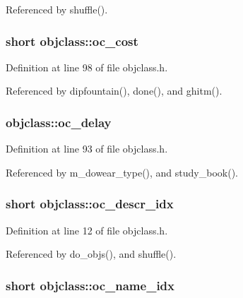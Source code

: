 Referenced by shuffle().

\hypertarget{structobjclass_aaf9cdc5c158d5ee7aad87728dcaa31cf}{
\subsubsection[{oc\+\_\+cost}]{\setlength{\rightskip}{0pt plus 5cm}short objclass\+::oc\+\_\+cost}}\label{structobjclass_aaf9cdc5c158d5ee7aad87728dcaa31cf}


Definition at line 98 of file objclass.\+h.



Referenced by dipfountain(), done(), and ghitm().

\hypertarget{structobjclass_a3469efe1c95970cd0360b882459a42ae}{
\subsubsection[{oc\+\_\+delay}]{ objclass\+::oc\+\_\+delay}}\label{structobjclass_a3469efe1c95970cd0360b882459a42ae}


Definition at line 93 of file objclass.\+h.



Referenced by m\+\_\+dowear\+\_\+type(), and study\+\_\+book().

\hypertarget{structobjclass_a4b22aa20d7c87b250d6696e1614b86cc}{
\subsubsection[{oc\+\_\+descr\+\_\+idx}]{\setlength{\rightskip}{0pt plus 5cm}short objclass\+::oc\+\_\+descr\+\_\+idx}}\label{structobjclass_a4b22aa20d7c87b250d6696e1614b86cc}


Definition at line 12 of file objclass.\+h.



Referenced by do\+\_\+objs(), and shuffle().

\hypertarget{structobjclass_adb4e710c1fe8070f63bb31017783e1ff}{
\subsubsection[{oc\+\_\+name\+\_\+idx}]{\setlength{\rightskip}{0pt plus 5cm}short objclass\+::oc\+\_\+name\+\_\+idx}}\label{structobjclass_adb4e710c1fe8070f63bb31017783e1ff}


